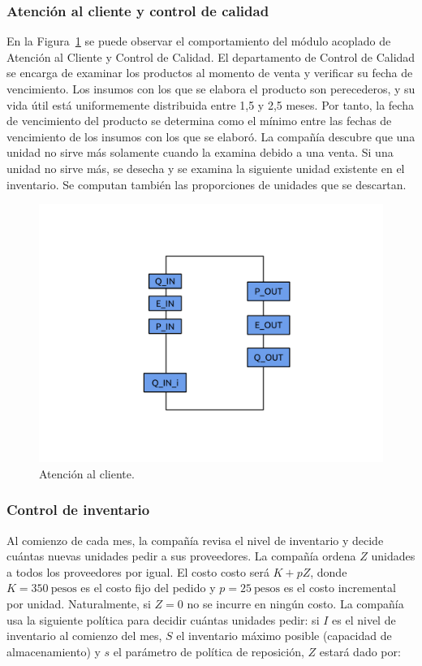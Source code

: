 \documentclass[10pt]{article}
\begin{document}
\subsubsection{Atención al cliente y control de calidad}
En la Figura~\ref{fig:fig5} se puede observar el comportamiento del módulo acoplado de Atención al Cliente y Control de Calidad. El departamento de Control de Calidad se encarga de examinar los productos al momento de venta y verificar su fecha de vencimiento. Los insumos con los que se elabora el producto son perecederos, y su vida útil está uniformemente distribuida entre 1,5 y 2,5 meses. Por tanto, la fecha de vencimiento del producto se determina como el mínimo entre las fechas de vencimiento de los insumos con los que se elaboró. La compañía descubre que una unidad no sirve más solamente cuando la examina debido a una venta. Si una unidad no sirve más, se desecha  y se examina la siguiente unidad existente en el inventario. Se computan también las proporciones de unidades que se descartan.

\begin{figure}
\centering
\includegraphics[scale=1]{img/figura5}
\caption{Atención al cliente.}
\label{fig:fig5}
\end{figure}

\subsubsection{Control de inventario}

Al comienzo de cada mes, la compañía revisa el nivel de inventario y decide cuántas nuevas unidades pedir a sus proveedores. La compañía ordena $Z$ unidades a todos los proveedores por igual. El costo costo será $K + pZ$, donde $K = 350~\textrm{pesos}$ es el costo fijo del pedido y $p = 25~\textrm{pesos}$ es el costo incremental por unidad. Naturalmente, si $Z = 0$ no se incurre en ningún costo. La compañía usa la siguiente política para decidir cuántas unidades pedir: si $I$ es el nivel de inventario al comienzo del mes, $S$ el inventario máximo posible (capacidad de almacenamiento) y $s$ el parámetro de política de reposición, $Z$ estará dado por:
\end{document}
